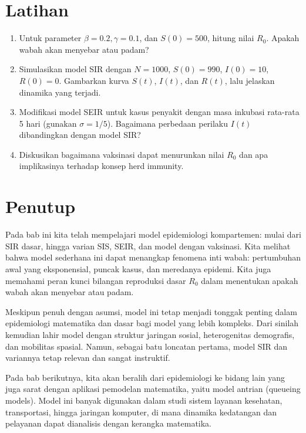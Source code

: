 \documentclass{bukumjh}
\begin{document}
\section{Latihan}

\begin{enumerate}
    \item Untuk parameter $\beta=0.2, \gamma=0.1$, dan $S(0)=500$, hitung nilai $R_0$. Apakah wabah akan menyebar atau padam?
    \item Simulasikan model SIR dengan $N=1000$, $S(0)=990$, $I(0)=10$, $R(0)=0$. Gambarkan kurva $S(t)$, $I(t)$, dan $R(t)$, lalu jelaskan dinamika yang terjadi.
    \item Modifikasi model SEIR untuk kasus penyakit dengan masa inkubasi rata-rata 5 hari (gunakan $\sigma = 1/5$). Bagaimana perbedaan perilaku $I(t)$ dibandingkan dengan model SIR?
    \item Diskusikan bagaimana vaksinasi dapat menurunkan nilai $R_0$ dan apa implikasinya terhadap konsep herd immunity.
\end{enumerate}

\section{Penutup}

Pada bab ini kita telah mempelajari {\jsg model epidemiologi kompartemen}: mulai dari SIR dasar, hingga varian SIS, SEIR, dan model dengan vaksinasi. Kita melihat bahwa model sederhana ini dapat menangkap fenomena inti wabah: pertumbuhan awal yang eksponensial, puncak kasus, dan meredanya epidemi. Kita juga memahami peran kunci bilangan reproduksi dasar $R_0$ dalam menentukan apakah wabah akan menyebar atau padam.

Meskipun penuh dengan asumsi, model ini tetap menjadi tonggak penting dalam epidemiologi matematika dan dasar bagi model yang lebih kompleks. Dari sinilah kemudian lahir model dengan struktur jaringan sosial, heterogenitas demografis, dan mobilitas spasial. Namun, sebagai batu loncatan pertama, model SIR dan variannya tetap relevan dan sangat instruktif.

Pada bab berikutnya, kita akan beralih dari epidemiologi ke bidang lain yang juga sarat dengan aplikasi pemodelan matematika, yaitu {\jsg model antrian (queueing models)}. Model ini banyak digunakan dalam studi sistem layanan kesehatan, transportasi, hingga jaringan komputer, di mana dinamika kedatangan dan pelayanan dapat dianalisis dengan kerangka matematika.
\end{document}
